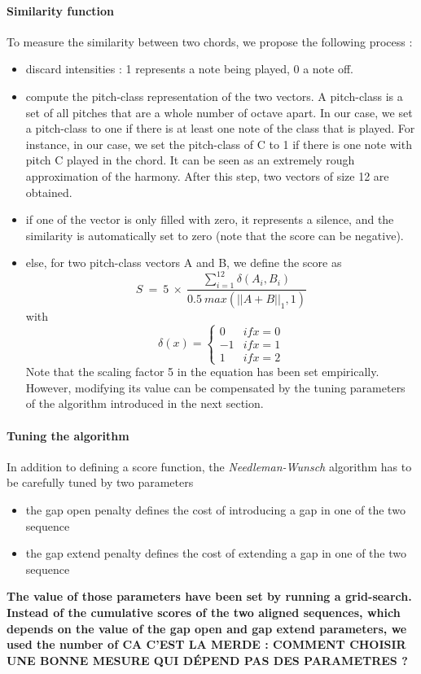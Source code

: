 \documentclass[twoside,twocolumn]{article}
\begin{document}
\paragraph{Similarity function}
To measure the similarity between two chords, we propose the following process :
\begin{itemize}
\item discard intensities : 1 represents a note being played, 0 a note off.
\item compute the pitch-class representation of the two vectors. A pitch-class is a set of all pitches that are a whole number of octave apart. 
In our case, we set a pitch-class to one if there is at least one note of the class that is played.
For instance, in our case, we set the pitch-class of C to 1 if there is one note with pitch C played in the chord.
It can be seen as an extremely rough approximation of the harmony.
After this step, two vectors of size 12 are obtained.
\item if one of the vector is only filled with zero, it represents a silence, and the similarity is automatically set to zero (note that the score can be negative).
\item else, for two pitch-class vectors A and B, we define the score as 
\begin{equation}
S \ = \ 5 \ \times \ \frac{\sum_{i=1}^{12} \delta(A_i , B_i)}{0.5 \ max(||A+B||_1 , 1)}
\label{eq:score_function}
\end{equation}
with
\[\delta(x) =
    \begin{cases*}
      0 & if x = 0\\
      -1 & if x = 1\\
      1 & if x = 2
    \end{cases*} 
\]
Note that the scaling factor 5 in the equation  has been set empirically. However, modifying its value can be compensated by the tuning parameters of the algorithm introduced in the next section.
\end{itemize}


\paragraph{Tuning the algorithm}
In addition to defining a score function, the \textit{Needleman-Wunsch} algorithm has to be carefully tuned by two parameters
\begin{itemize}
\item the gap open penalty defines the cost of introducing a gap in one of the two sequence
\item the gap extend penalty defines the cost of extending a gap in one of the two sequence
\end{itemize}
\textbf{The value of those parameters have been set by running a grid-search. Instead of the cumulative scores of the two aligned sequences, which depends on the value of the gap open and gap extend parameters, we used the number of 
CA C'EST LA MERDE : COMMENT CHOISIR UNE BONNE MESURE QUI DÉPEND PAS DES PARAMETRES ?}
\end{document}
